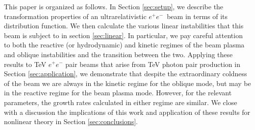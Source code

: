\documentclass[usenatbib,iop,apj,numberedappendix]{aeb_emulateapj_2015}
\newcommand\ac[1]{{\color{green} \bf #1}} %
\newcommand\bmath[1] {\mbox{\boldmath$\rm #1$}}
\newcommand{\epm}{\ensuremath{e^+e^-}}
\begin{document}
This paper is organized as follows.  In Section \ref{sec:setup}, we describe the transformation properties of an ultrarelativistic \epm\ beam in terms of its distribution function.  We then calculate the various linear instabilities that this beam is subject to in section \ref{sec:linear}.  In particular, we pay careful attention to both the reactive (or hydrodynamic) and kinetic regimes of the beam plasma and oblique instabilities and the transition between the two.  Applying these results to TeV $e^+e^-$ pair beams that arise from TeV photon pair production in Section \ref{sec:application},
we demonstrate that despite the extraordinary coldness of the beam we are always in the kinetic regime for the oblique mode, but may be in the reactive regime for the beam plasma mode.  However, for the relevant parameters, the growth rates calculated in either regime are similar.  We close with a discussion the implications of this work and application of these results for nonlinear theory in Section \ref{sec:conclusions}.

\end{document}
